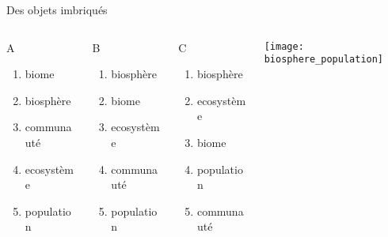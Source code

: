 \documentclass[10pt]{beamer}
\begin{document}
  

\begin{frame}{Des objets imbriqués} 
  \begin{columns}
    \begin{column}[c]{0.25\textwidth}
      \begin{small}
        \begin{block}{A}
          \begin{enumerate}
          \item biome
          \item biosphère
          \item communauté
          \item ecosystème
          \item population
          \end{enumerate}
        \end{block}
      \end{small}
    \end{column}
    \begin{column}[c]{0.25\textwidth}
      \begin{small}
        \begin{exampleblock}{B}
          \begin{enumerate}
          \item biosphère
          \item biome
          \item ecosystème
          \item communauté
          \item population
          \end{enumerate}
        \end{exampleblock}
      \end{small}
    \end{column}
    \begin{column}[c]{0.25\textwidth}
      \begin{small}
        \begin{block}{C}
          \begin{enumerate}
          \item biosphère
          \item ecosystème
          \item biome
          \item population
          \item communauté
          \end{enumerate}
        \end{block}
      \end{small}
    \end{column}
    \begin{column}[c]{0.25\textwidth}
      \begin{center}
        \texttt{[image: biosphere\_population]}
      \end{center}
    \end{column}
  \end{columns}
\end{frame}
\end{document}
